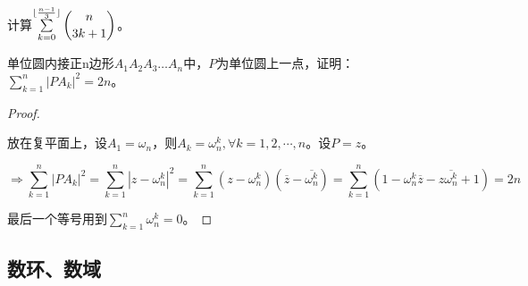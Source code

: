             \begin{exercise}
                计算$\sum\limits_{k=0}^{\lfloor \frac{n-1}{3} \rfloor}\dbinom{n}{3k+1}$。
            \end{exercise}

            \begin{example}
                单位圆内接正n边形$A_{1}A_{2}A_{3}\dots A_n$中，$P$为单位圆上一点，证明：$\sum\limits_{k=1}^n|PA_{k}|^{2}=2n$。
            \end{example}

            \begin{proof}

                \begin{center}
                \end{center}

                放在复平面上，设$A_{1}=\omega_n$，则$A_{k}=\omega_n^{k},\forall k=1,2,\cdots,n$。设$P=z$。

                \begin{equation}
                    \label{eq:unit_circle_proof1}
                    \Rightarrow\sum_{k=1}^n|PA_{k}|^{2}=\sum_{k=1}^n|z-\omega_n^{k}|^{2}=\sum_{k=1}^n(z-\omega_n^{k})(\overline{z}-\overline{\omega_n^{k}})=\sum_{k=1}^n\left( 1-\omega_n^{k}\overline{z}-z\overline{\omega_n^{k}}+1 \right)=2n
                    \nonumber
                \end{equation}

                最后一个等号用到$\sum\limits_{k=1}^n\omega_n^{k}=0$。
            \end{proof}

        \subsection{数环、数域}

